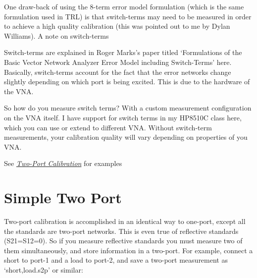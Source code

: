 \documentclass[letterpaper,10pt,english]{sphinxmanual}
\begin{document}
One draw-back of using the 8-term error model formulation (which is the same formulation used in TRL) is that switch-terms may need to be measured in order to achieve a high quality calibration (this was pointed out to me by Dylan Williams).
A note on switch-terms

Switch-terms are explained in Roger Marks's paper titled `Formulations of the Basic Vector Network Analyzer Error Model including Switch-Terms' here. Basically, switch-terms account for the fact that the error networks change slightly depending on which port is being excited. This is due to the hardware of the VNA.

So how do you measure switch terms? With a custom measurement configuration on the VNA itself. I have support for switch terms in my HP8510C class here, which you can use or extend to different VNA. Without switch-term measurements, your calibration quality will vary depending on properties of you VNA.

See {\hyperref[example_twoport_calibration::doc]{\emph{Two-Port Calibration}}} for examples


\section{Simple Two Port}
\label{calibration:simple-two-port}
Two-port calibration is accomplished in an identical way to one-port, except all the standards are two-port networks. This is even true of reflective standards (S21=S12=0). So if you measure reflective standards you must measure two of them simultaneously, and store information in a two-port. For example, connect a short to port-1 and a load to port-2, and save a two-port measurement as `short,load.s2p' or similar:
\end{document}
